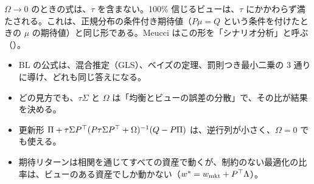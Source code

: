$\Omega\to0$ のときの式は、$\tau$ を含まない。100\% 信じるビューは、$\tau$ にかかわらず満たされる。これは、正規分布の条件付き期待値（$P\mu=Q$ という条件を付けたときの $\mu$ の期待値）と同じ形である。Meucci はこの形を「シナリオ分析」と呼ぶ（）。

\begin{keybox}[この章のまとめ]
\begin{itemize}
\item BL の公式は、混合推定（GLS）、ベイズの定理、罰則つき最小二乗の 3 通りに導け、どれも同じ答えになる。
\item どの見方でも、$\tau\Sigma$ と $\Omega$ は「均衡とビューの誤差の分散」で、その比が結果を決める。
\item 更新形 $\Pi+\tau\Sigma P^{\top}(P\tau\Sigma P^{\top}+\Omega)^{-1}(Q-P\Pi)$ は、逆行列が小さく、$\Omega=0$ でも使える。
\item 期待リターンは相関を通じてすべての資産で動くが、制約のない最適化の比率は、ビューのある資産でしか動かない（$w^*=w_{\mathrm{mkt}}+P^{\top}\Lambda$）。
\end{itemize}
\end{keybox}
